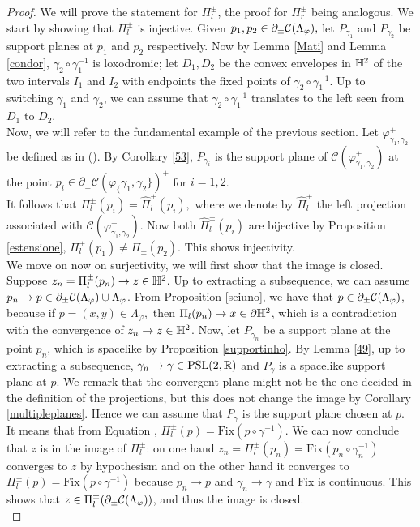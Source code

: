 \begin{proof}
    We will prove the statement for $\Pi_l^\pm$, the proof for $\Pi_r^\pm$ being analogous. We start by showing that $\Pi_l^\pm$ is injective. Given $p_1,p_2\in\partial_\pm\mathcal{C}(\Lambda_\varphi),$ let $P_{\gamma_1}$ and $P_{\gamma_2}$ be support planes at $p_1$ and $p_2$ respectively. Now by Lemma \ref{Mati} and Lemma \ref{condor}, $\gamma_2\circ\gamma_1^{-1}$ is loxodromic; let $D_1, D_2$ be the convex envelopes in $\mathbb{H}^2$ of the two intervals $I_1$ and $I_2$ with endpoints the fixed points of $\gamma_2\circ\gamma_1^{-1}$. Up to switching $\gamma_1$ and $\gamma_2$, we can assume that $\gamma_2\circ\gamma_1^{-1}$ translates to the left seen from $D_1$ to $D_2$. \\
    Now, we will refer to the fundamental example of the previous section. Let $\varphi_{\gamma_1,\gamma_2}^+$ be defined as in (). By Corollary \ref{53}, $P_{\gamma_i}$ is the support plane of $\mathcal{C}(\varphi_{\gamma_1,\gamma_2}^+)$ at the point $p_i\in\partial_\pm\mathcal{C}(\varphi_\{\gamma_1,\gamma_2\})^+$ for $i=1,2$.\\
    It follows that $\Pi_l^\pm(p_i)=\hat{\Pi}_l^\pm(p_i),$ where we denote by $\hat{\Pi}_l^\pm$ the left projection associated with $\mathcal{C}(\varphi_{\gamma_1,\gamma_2}^+)$. Now both $\hat{\Pi}_l^\pm(p_i)$ are bijective by Proposition \ref{estensione}, $\Pi_l^\pm(p_1)\neq\Pi_\pm(p_2)$. This shows injectivity. \\   
    We move on now on surjectivity, we will first show that the image is closed. Suppose $z_n=\Pi_l^\pm(p_n)\to z\in\mathbb{H}^2$. Up to extracting a subsequence, we can assume $p_n\to p\in\partial_\pm\mathcal{C}(\Lambda_\varphi)\cup\Lambda_\varphi$. From Proposition \ref{seiuno}, we have that $p\in\partial_\pm\mathcal{C}(\Lambda_\varphi)$, because if $p=(x,y)\in \Lambda_\varphi,$ then $\Pi_l(p_n)\to x\in\partial\mathbb{H}^2$, which is a contradiction with the convergence of $z_n\to z\in\mathbb{H}^2$. Now, let $P_{\gamma_n}$ be a support plane at the point $p_n$, which is spacelike by Proposition \ref{supportinho}. By Lemma \ref{49}, up to extracting a subsequence, $\gamma_n\to\gamma\in\text{PSL}(2,\mathbb{R})$ and $P_\gamma$ is a spacelike support plane at $p$. We remark that the convergent plane might not be the one decided in the definition of the projections, but this does not change the image by Corollary \ref{multipleplanes}. Hence we can assume that $P_\gamma$ is the support plane chosen at $p$. It means that from Equation , $\Pi_l^\pm(p)=\text{Fix}(p\circ\gamma^{-1})$. We can now conclude that $z$ is in the image of $\Pi_l^\pm$: on one hand $z_n=\Pi_l^\pm(p_n)=\text{Fix}(p_n\circ\gamma_n^{-1})$ converges to $z$ by hypothesism and on the other hand it converges to $\Pi_l^\pm(p)=\text{Fix}(p\circ\gamma^{-1})$ because $p_n\to p$ and $\gamma_n\to\gamma$ and $\text{Fix}$ is continuous. This shows that $z\in\Pi_l^\pm(\partial_\pm\mathcal{C}(\Lambda_\varphi))$, and thus the image is closed. \\ 

\end{proof}
